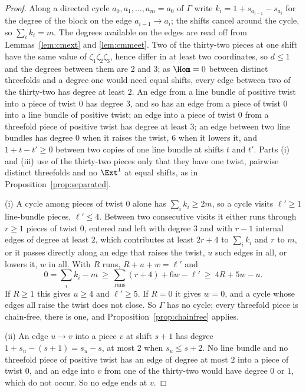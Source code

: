 \begin{proof}
Along a directed cycle $a_{0},a_{1},\dots,a_{m}=a_{0}$ of $\Gamma$ write $k_{i}=1+s_{a_{i-1}}-s_{a_{i}}$ for the degree of the block on the edge $a_{i-1}\to a_{i}$; the shifts cancel around the cycle, so $\sum_{i}k_{i}=m$. The degrees available on the edges are read off from Lemmas~\ref{lem:cmext} and \ref{lem:cmmeet}. Two of the thirty-two pieces at one shift have the same value of $\zeta_{1}\zeta_{2}\zeta_{3}$, hence differ in at least two coordinates, so $d\le1$ and the degrees between them are $2$ and $3$; as $\Hom=0$ between distinct threefolds and a degree one would need equal shifts, every edge between two of the thirty-two has degree at least $2$. An edge from a line bundle of positive twist into a piece of twist $0$ has degree $3$, and so has an edge from a piece of twist $0$ into a line bundle of positive twist; an edge into a piece of twist $0$ from a threefold piece of positive twist has degree at least $3$; an edge between two line bundles has degree $0$ when it raises the twist, $6$ when it lowers it, and $1+t-t'\ge0$ between two copies of one line bundle at shifts $t$ and $t'$. Parts (i) and (iii) use of the thirty-two pieces only that they have one twist, pairwise distinct threefolds and no $\Ext^{1}$ at equal shifts, as in Proposition~\ref{prop:separated}.

(i) A cycle among pieces of twist $0$ alone has $\sum_{i}k_{i}\ge2m$, so a cycle visits $\ell'\ge1$ line-bundle pieces, $\ell'\le4$. Between two consecutive visits it either runs through $r\ge1$ pieces of twist $0$, entered and left with degree $3$ and with $r-1$ internal edges of degree at least $2$, which contributes at least $2r+4$ to $\sum_{i}k_{i}$ and $r$ to $m$, or it passes directly along an edge that raises the twist, $u$ such edges in all, or lowers it, $w$ in all. With $R$ runs, $R+u+w=\ell'$ and
\[
0=\sum_{i}k_{i}-m\ \ge\ \sum_{\mathrm{runs}}(r+4)+6w-\ell'\ \ge\ 4R+5w-u .
\]
If $R\ge1$ this gives $u\ge4$ and $\ell'\ge5$. If $R=0$ it gives $w=0$, and a cycle whose edges all raise the twist does not close. So $\Gamma$ has no cycle; every threefold piece is chain-free, there is one, and Proposition~\ref{prop:chainfree} applies.

(ii) An edge $u\to v$ into a piece $v$ at shift $s+1$ has degree $1+s_{u}-(s+1)=s_{u}-s$, at most $2$ when $s_{u}\le s+2$. No line bundle and no threefold piece of positive twist has an edge of degree at most $2$ into a piece of twist $0$, and an edge into $v$ from one of the thirty-two would have degree $0$ or $1$, which do not occur. So no edge ends at $v$.


\end{proof}
